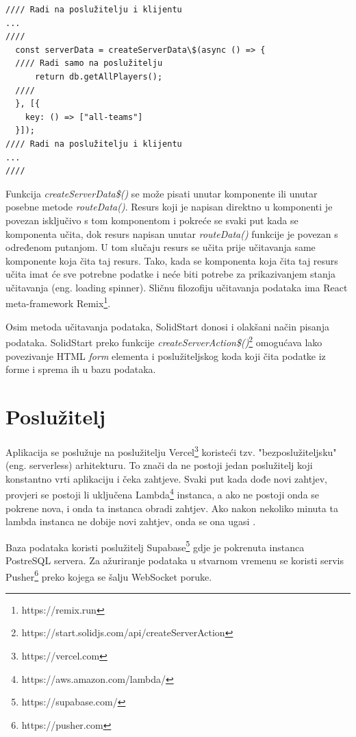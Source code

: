 \documentclass[times, utf8, zavrsni]{fer}
\begin{document}
\begin{lstlisting}[caption=Učitavanje podataka s poslužitelja]
//// Radi na poslužitelju i klijentu
...
////
  const serverData = createServerData\$(async () => {
  //// Radi samo na poslužitelju
      return db.getAllPlayers();
  ////
  }, [{
    key: () => ["all-teams"]
  }]);
//// Radi na poslužitelju i klijentu
...
////
\end{lstlisting}

Funkcija \emph{createServerData\$()} se može pisati unutar komponente ili unutar posebne metode \emph{routeData()}.
Resurs koji je napisan direktno u komponenti je povezan isključivo s tom komponentom i pokreće se svaki put kada se komponenta učita, dok resurs napisan unutar \emph{routeData()} funkcije je povezan s određenom putanjom.
U tom slučaju resurs se učita prije učitavanja same komponente koja čita taj resurs. Tako, kada se komponenta koja čita taj resurs učita imat će sve potrebne podatke i neće biti potrebe za prikazivanjem stanja učitavanja (eng. loading spinner).
Sličnu filozofiju učitavanja podataka ima React meta-framework Remix\footnote{https://remix.run}.

Osim metoda učitavanja podataka, SolidStart donosi i olakšani način pisanja podataka.
SolidStart preko funkcije \emph{createServerAction\$()}\footnote{https://start.solidjs.com/api/createServerAction} omogućava lako povezivanje HTML \emph{form} elementa i poslužiteljskog koda koji čita podatke iz forme i sprema ih u bazu podataka.

\section{Poslužitelj}
Aplikacija se poslužuje na poslužitelju Vercel\footnote{https://vercel.com} koristeći tzv. "bezposlužiteljsku" (eng. serverless) arhitekturu.
To znači da ne postoji jedan poslužitelj koji konstantno vrti aplikaciju i čeka zahtjeve. Svaki put kada dođe novi zahtjev, provjeri se postoji li uključena Lambda\footnote{https://aws.amazon.com/lambda/} instanca, a ako ne postoji onda se pokrene nova, i onda ta instanca obradi zahtjev.
Ako nakon nekoliko minuta ta lambda instanca ne dobije novi zahtjev, onda se ona ugasi \citep{serverless2022}.

Baza podataka koristi poslužitelj Supabase\footnote{https://supabase.com/} gdje je pokrenuta instanca PostreSQL servera.
Za ažuriranje podataka u stvarnom vremenu se koristi servis Pusher\footnote{https://pusher.com} preko kojega se šalju WebSocket poruke.
\end{document}

